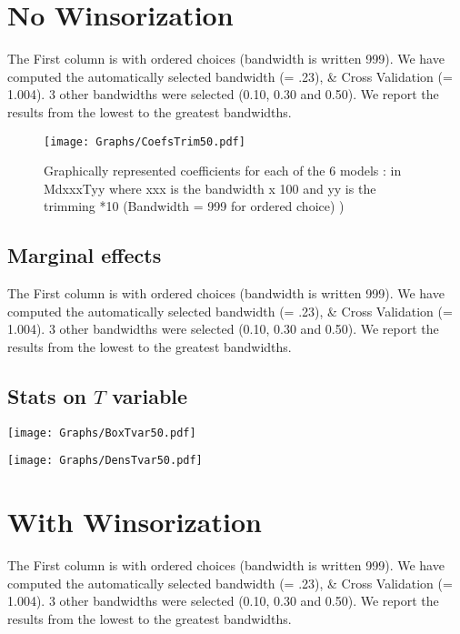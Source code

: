 \documentclass[a4paper]{article}
\begin{document}
\section{No Winsorization}
The First column is with ordered choices (bandwidth is written 999). We  have computed the  automatically selected bandwidth  (= .23), \& Cross Validation (= 1.004). 3 other  bandwidths were selected (0.10, 0.30 and 0.50). We report the results from the lowest to the greatest bandwidths. \\



\newpage

\begin{sidewaysfigure}[h!]
\caption{Graphically represented coefficients for each of the 6 models : in MdxxxTyy  where xxx is the bandwidth x 100 and yy is the trimming *10 (Bandwidth = 999 for ordered choice) )}\label{PlotFOK}
\texttt{[image: Graphs/CoefsTrim50.pdf]}

\end{sidewaysfigure}
\clearpage

\subsection{Marginal effects}
%


The First column is with ordered choices (bandwidth is written 999). We  have computed the  automatically selected bandwidth  (= .23), \& Cross Validation (= 1.004). 3 other  bandwidths were selected (0.10, 0.30 and 0.50). We report the results from the lowest to the greatest bandwidths. \\


\newpage
\subsection{Stats on $T$ variable}



\texttt{[image: Graphs/BoxTvar50.pdf]}


\texttt{[image: Graphs/DensTvar50.pdf]}

\section{With Winsorization}
The First column is with ordered choices (bandwidth is written 999). We  have computed the  automatically selected bandwidth  (= .23), \& Cross Validation (= 1.004). 3 other  bandwidths were selected (0.10, 0.30 and 0.50). We report the results from the lowest to the greatest bandwidths. \\
\end{document}
